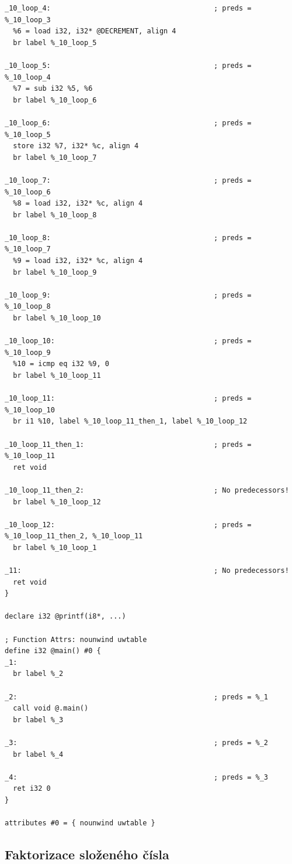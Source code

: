 \documentclass[12pt,a4paper]{article}
\begin{document}
\begin{verbatim}
_10_loop_4:                                       ; preds = %_10_loop_3
  %6 = load i32, i32* @DECREMENT, align 4
  br label %_10_loop_5

_10_loop_5:                                       ; preds = %_10_loop_4
  %7 = sub i32 %5, %6
  br label %_10_loop_6

_10_loop_6:                                       ; preds = %_10_loop_5
  store i32 %7, i32* %c, align 4
  br label %_10_loop_7

_10_loop_7:                                       ; preds = %_10_loop_6
  %8 = load i32, i32* %c, align 4
  br label %_10_loop_8

_10_loop_8:                                       ; preds = %_10_loop_7
  %9 = load i32, i32* %c, align 4
  br label %_10_loop_9

_10_loop_9:                                       ; preds = %_10_loop_8
  br label %_10_loop_10

_10_loop_10:                                      ; preds = %_10_loop_9
  %10 = icmp eq i32 %9, 0
  br label %_10_loop_11

_10_loop_11:                                      ; preds = %_10_loop_10
  br i1 %10, label %_10_loop_11_then_1, label %_10_loop_12

_10_loop_11_then_1:                               ; preds = %_10_loop_11
  ret void

_10_loop_11_then_2:                               ; No predecessors!
  br label %_10_loop_12

_10_loop_12:                                      ; preds = %_10_loop_11_then_2, %_10_loop_11
  br label %_10_loop_1

_11:                                              ; No predecessors!
  ret void
}

declare i32 @printf(i8*, ...)

; Function Attrs: nounwind uwtable
define i32 @main() #0 {
_1:
  br label %_2

_2:                                               ; preds = %_1
  call void @.main()
  br label %_3

_3:                                               ; preds = %_2
  br label %_4

_4:                                               ; preds = %_3
  ret i32 0
}

attributes #0 = { nounwind uwtable }
\end{verbatim}

\subsection{Faktorizace složeného čísla}
\label{sec:pollard}
\end{document}
